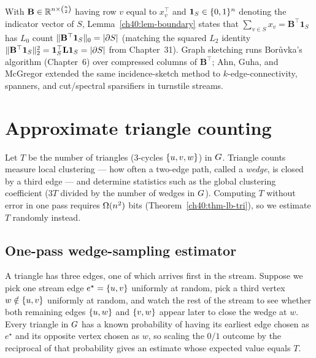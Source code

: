 \begin{connectionbox}
With $\mathbf{B}\in\mathbb{R}^{n\times\binom{n}{2}}$ having row $v$ equal to $x_v^\top$
and $\mathbf{1}_S\in\{0,1\}^n$ denoting the indicator vector of $S$,
Lemma~\ref{ch40:lem-boundary} states that $\sum_{v\in S} x_v = \mathbf{B}^\top\mathbf{1}_S$
has $L_0$ count $\lVert\mathbf{B}^\top\mathbf{1}_S\rVert_0 = \lvert\partial S\rvert$
(matching the squared $L_2$ identity
$\lVert\mathbf{B}^\top\mathbf{1}_S\rVert_2^2 = \mathbf{1}_S^\top\mathbf{L}\mathbf{1}_S = \lvert\partial S\rvert$
from Chapter~31). Graph sketching runs Bor\r{u}vka's algorithm (Chapter~6) over
compressed columns of $\mathbf{B}^\top$; Ahn, Guha, and McGregor extended the
same incidence-sketch method to $k$-edge-connectivity, spanners, and cut/spectral
sparsifiers in turnstile streams.
\end{connectionbox}

\section{Approximate triangle counting}
\label{ch40:triangles}

Let $T$ be the number of triangles ($3$-cycles $\{u,v,w\}$) in $G$.
Triangle counts measure local clustering --- how often a two-edge path, called a
\emph{wedge}, is closed by a third edge --- and determine statistics such as the
global clustering coefficient ($3T$ divided by the number of wedges in $G$).
Computing $T$ without error in one pass requires $\Omega(n^2)$ bits
(Theorem~\ref{ch40:thm-lb-tri}), so we estimate $T$ randomly instead.

\subsection{One-pass wedge-sampling estimator}

\begin{intuitionbox}
A triangle has three edges, one of which arrives first in the stream. Suppose
we pick one stream edge $e^\star=\{u,v\}$ uniformly at random, pick a third
vertex $w\notin\{u,v\}$ uniformly at random, and watch the rest of the stream
to see whether both remaining edges $\{u,w\}$ and $\{v,w\}$ appear later to
close the wedge at $w$. Every triangle in $G$ has a known probability of
having its earliest edge chosen as $e^\star$ and its opposite vertex chosen as
$w$, so scaling the $0/1$ outcome by the reciprocal of that probability gives an
estimate whose expected value equals $T$.
\end{intuitionbox}

